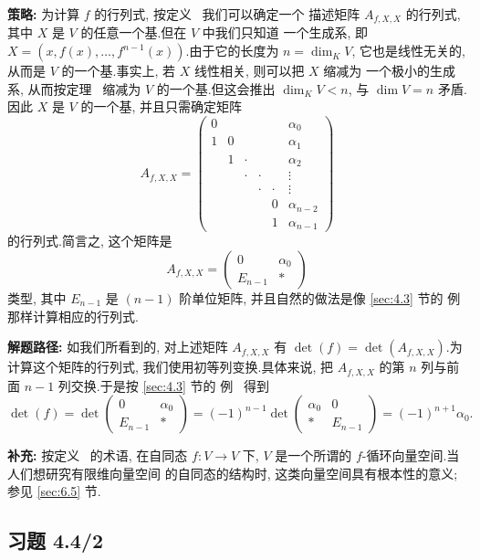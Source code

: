 \noindent\textbf{策略:} 为计算 $f$ 的行列式, 按定义~ 我们可以确定一个
描述矩阵 $A_{f, X, X}$ 的行列式, 其中 $X$ 是 $V$ 的任意一个基.但在 $V$ 中我们只知道
一个生成系, 即 $X = (x, f(x), \ldots, f^{n-1}(x))$.由于它的长度为 $n = \dim_K V$,
它也是线性无关的, 从而是 $V$ 的一个基.事实上, 若 $X$ 线性相关, 则可以把 $X$ 缩减为
一个极小的生成系, 从而按定理~ 缩减为 $V$ 的一个基.但这会推出
$\dim_K V < n$, 与 $\dim V = n$ 矛盾.因此 $X$ 是 $V$ 的一个基, 并且只需确定矩阵
\[
A_{f, X, X} = \begin{pmatrix} 0 & & & & & \alpha_0 \\ 1 & 0 & & & & \alpha_1 \\ & 1 & \cdot & & & \alpha_2 \\ & & \cdot & \cdot & & \vdots \\ & & & \cdot & \cdot & \vdots \\ & & & & 0 & \alpha_{n-2} \\ & & & & 1 & \alpha_{n-1} \end{pmatrix}
\]
的行列式.简言之, 这个矩阵是
\[
A_{f, X, X} = \begin{pmatrix} 0 & \alpha_0 \\ E_{n-1} & * \end{pmatrix}
\]
类型, 其中 $E_{n-1}$ 是 $(n-1)$ 阶单位矩阵, 并且自然的做法是像 \ref{sec:4.3} 节的
例~ 那样计算相应的行列式.

\noindent\textbf{解题路径:} 如我们所看到的, 对上述矩阵 $A_{f, X, X}$ 有
$\det(f) = \det(A_{f, X, X})$.为计算这个矩阵的行列式, 我们使用初等列变换.具体来说,
把 $A_{f, X, X}$ 的第 $n$ 列与前面 $n - 1$ 列交换.于是按 \ref{sec:4.3} 节的
例~ 得到
\[
\det(f) = \det \begin{pmatrix} 0 & \alpha_0 \\ E_{n-1} & * \end{pmatrix} = (-1)^{n-1} \det \begin{pmatrix} \alpha_0 & 0 \\ * & E_{n-1} \end{pmatrix} = (-1)^{n+1} \alpha_0\text{.}
\]

\noindent\textbf{补充:} 按定义~ 的术语, 在自同态 $f \colon V
\longrightarrow V$ 下, $V$ 是一个所谓的 $f$-循环向量空间.当人们想研究有限维向量空间
的自同态的结构时, 这类向量空间具有根本性的意义; 参见 \ref{sec:6.5} 节.

\subsection*{习题 4.4/2}

